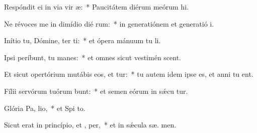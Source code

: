 \item Respóndit ei in via vir æ:~* Paucitátem diérum meórum  hi.
\item Ne révoces me in dimídio dié rum:~* in generatiónem et generatió  i.
\item Inítio tu, Dómine, ter ti:~* et ópera mánuum tu  li.
\item Ipsi períbunt, tu  manes:~* et omnes sicut vestimén scent.
\item Et sicut opertórium mutábis eos, et tur:~* tu autem idem ipse es, et anni tu  ent.
\item Fílii servórum tuórum bunt:~* et semen eórum in sǽcu tur.
\item Glória Pa,  lio,~* et Spi to.
\item Sicut erat in princípio, et ,  per,~* et in sǽcula sæ. men.
